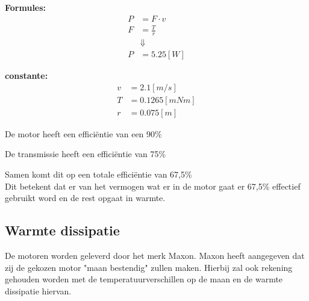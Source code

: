 \begin{multicols}{2}
        \textbf{Formules:}
        \begin{equation}
            \begin{split}
                P &= F \cdot v \\
                F &= \frac{T}{r} \\
                &\Downarrow \\
                P &= 5.25 [W]
            \end{split}
        \end{equation}

        \textbf{constante:}
        \begin{equation*}
            \begin{split}
                v &= 2.1 [m/s] \\
                T &= 0.1265[mNm]  \\
                r &= 0.075[m]
            \end{split}
        \end{equation*}
    \end{multicols}

De motor heeft een efficiëntie van een 90\%

De transmissie heeft een efficiëntie van 75\%

Samen komt dit op een totale efficiëntie van 67,5\% \\
Dit betekent dat er van het vermogen wat er in de motor gaat er 67,5\% effectief gebruikt word en de rest opgaat in warmte.

\subsection{Warmte dissipatie}

De motoren worden geleverd door het merk Maxon. Maxon heeft aangegeven dat zij de gekozen motor "maan bestendig" zullen maken. Hierbij zal ook rekening gehouden worden met de temperatuurverschillen op de maan en de warmte dissipatie hiervan. 
